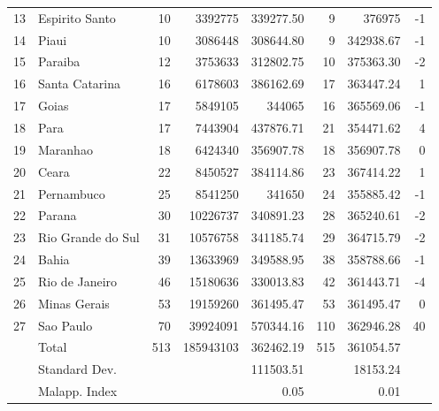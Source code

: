 \documentclass[a4paper,12pt]{article}
\begin{document}
\begin{landscape}
\begin{table}[!htb]
{{\begin{tabular}{rlrrrrrr}
  13 & Espirito Santo & 10 & 3392775 & 339277.50 & 9 & 376975 & -1 \\ 
  14 & Piaui & 10 & 3086448 & 308644.80 & 9 & 342938.67 & -1 \\ 
  15 & Paraiba & 12 & 3753633 & 312802.75 & 10 & 375363.30 & -2 \\ 
  16 & Santa Catarina & 16 & 6178603 & 386162.69 & 17 & 363447.24 & 1 \\ 
  17 & Goias & 17 & 5849105 & 344065 & 16 & 365569.06 & -1 \\ 
  18 & Para & 17 & 7443904 & 437876.71 & 21 & 354471.62 & 4 \\ 
  19 & Maranhao & 18 & 6424340 & 356907.78 & 18 & 356907.78 & 0 \\ 
  20 & Ceara & 22 & 8450527 & 384114.86 & 23 & 367414.22 & 1 \\ 
  21 & Pernambuco & 25 & 8541250 & 341650 & 24 & 355885.42 & -1 \\ 
  22 & Parana & 30 & 10226737 & 340891.23 & 28 & 365240.61 & -2 \\ 
  23 & Rio Grande do Sul & 31 & 10576758 & 341185.74 & 29 & 364715.79 & -2 \\ 
  24 & Bahia & 39 & 13633969 & 349588.95 & 38 & 358788.66 & -1 \\ 
  25 & Rio de Janeiro & 46 & 15180636 & 330013.83 & 42 & 361443.71 & -4 \\ 
  26 & Minas Gerais & 53 & 19159260 & 361495.47 & 53 & 361495.47 & 0 \\ 
  27 & Sao Paulo & 70 & 39924091 & 570344.16 & 110 & 362946.28 & 40 \\
  \hline
 & Total & 513 & 185943103 & 362462.19 & 515 & 361054.57 &  \\ 
 & Standard Dev. &  &  & 111503.51 &  & 18153.24 &  \\ 
 & Malapp. Index &  &  & 0.05 &  & 0.01 &  \\ 
   \hline \hline
\end{tabular}
}}
\end{table}
\end{landscape}
\end{document}

